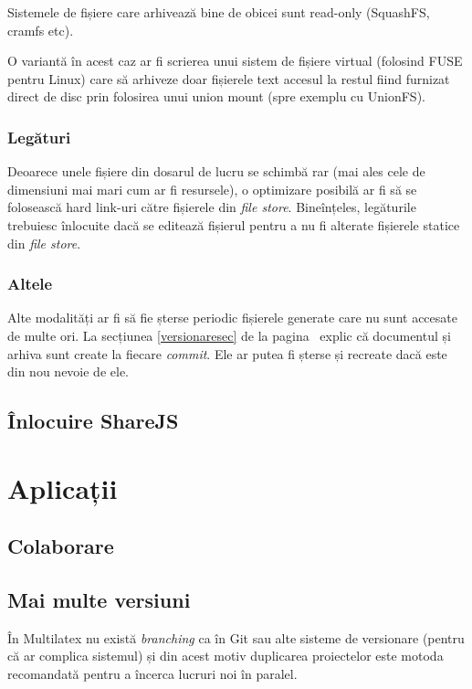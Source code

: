 \documentclass[a4wide,12pt]{report}
\newcommand{\eng}[1]{\emph{#1}} %
\newcommand{\acr}[1]{{\textsmaller[1]{\textsc{#1}}}} %
\begin{document}
Sistemele de fișiere care arhivează bine de obicei sunt read-only (SquashFS,
cramfs etc).

O variantă în acest caz ar fi scrierea unui sistem de fișiere virtual (folosind
FUSE pentru Linux) care să arhiveze doar fișierele text accesul la restul fiind
furnizat direct de disc prin folosirea unui union mount (spre exemplu cu
UnionFS).

\subsection{Legături}

Deoarece unele fișiere din dosarul de lucru se schimbă rar (mai ales cele
de dimensiuni mai mari cum ar fi resursele), o optimizare posibilă ar fi să se
folosească hard link-uri către fișierele din \eng{file store}. Bineînțeles,
legăturile trebuiesc înlocuite dacă se editează fișierul pentru a nu fi alterate
fișierele statice din \eng{file store}.

\subsection{Altele}

Alte modalități ar fi să fie șterse periodic fișierele generate care nu sunt
accesate de multe ori. La secțiunea \ref{versionaresec} de la
pagina~\pageref{versionaresec} explic că documentul \acr{PDF} și arhiva
\acr{ZIP} sunt create la fiecare \eng{commit}. Ele ar putea fi șterse și
recreate dacă este din nou nevoie de ele.

\section{Înlocuire ShareJS}

\chapter{Aplicații}

\section{Colaborare}

\section{Mai multe versiuni}
\label{mulverssec}

În Multilatex nu există \eng{branching} ca în Git sau alte sisteme de versionare
(pentru că ar complica sistemul) și din acest motiv duplicarea proiectelor este
motoda recomandată pentru a încerca lucruri noi în paralel.
\end{document}

